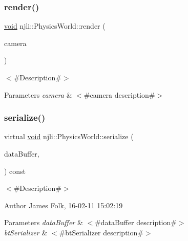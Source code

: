 \subsubsection{\texorpdfstring{render()}{render()}}
{\footnotesize\ttfamily \mbox{\hyperlink{_thread_8h_af1e856da2e658414cb2456cb6f7ebc66}{void}} njli\+::\+Physics\+World\+::render (\begin{DoxyParamCaption}\item[{\mbox{\hyperlink{classnjli_1_1_camera}{Camera}} $\ast$}]{camera }\end{DoxyParamCaption})}

$<$\#\+Description\#$>$


\begin{DoxyParams}{Parameters}
{\em camera} & $<$\#camera description\#$>$ \\
\hline
\end{DoxyParams}
\mbox{\label{classnjli_1_1_physics_world_aac4422bdcfb063b92aa0a39c889e5b07}} 
\subsubsection{\texorpdfstring{serialize()}{serialize()}}
{\footnotesize\ttfamily virtual \mbox{\hyperlink{_thread_8h_af1e856da2e658414cb2456cb6f7ebc66}{void}} njli\+::\+Physics\+World\+::serialize (\begin{DoxyParamCaption}\item[{\mbox{\hyperlink{_thread_8h_af1e856da2e658414cb2456cb6f7ebc66}{void}} $\ast$}]{data\+Buffer,  }\item[{bt\+Serializer $\ast$}]{ }\end{DoxyParamCaption}) const\hspace{0.3cm}{\ttfamily [virtual]}}



$<$\#\+Description\#$>$ 

\begin{DoxyAuthor}{Author}
James Folk, 16-\/02-\/11 15\+:02\+:19
\end{DoxyAuthor}

\begin{DoxyParams}{Parameters}
{\em data\+Buffer} & $<$\#data\+Buffer description\#$>$ \\
\hline
{\em bt\+Serializer} & $<$\#bt\+Serializer description\#$>$ \\
\hline
\end{DoxyParams}


